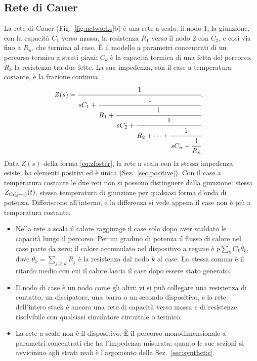 \documentclass[10pt,a4paper]{scrartcl}
\let\newcommand\fcitdefine
\newcommand{\Zjc}{Z_\mathrm{th(j-c)}}
\begin{document}
\subsection{Rete di Cauer}
La rete di Cauer (Fig.~\ref{fig:networks}b) è una rete a scala: il nodo 1, la giunzione, con la capacità $C_1$ verso massa, la resistenza $R_1$ verso il nodo 2 con $C_2$, e così via fino a $R_n$, che termina al case. È il modello a parametri concentrati di un percorso termico a strati piani: $C_k$ è la capacità termica di una fetta del percorso, $R_k$ la resistenza tra due fette. La sua impedenza, con il case a temperatura costante, è la frazione continua
\begin{equation}
Z(s) = \cfrac{1}{sC_1 + \cfrac{1}{R_1 + \cfrac{1}{sC_2 + \cfrac{1}{R_2 + \cdots + \cfrac{1}{sC_n + \cfrac{1}{R_n}}}}}} .
\label{eq:zcauer}
\end{equation}
Data $Z(s)$ della forma \eqref{eq:zfoster}, la rete a scala con la stessa impedenza esiste, ha elementi positivi ed è unica (Sez.~\ref{sec:positive}). Con il case a temperatura costante le due reti non si possono distinguere dalla giunzione: stessa $\Zjc(t)$, stessa temperatura di giunzione per qualsiasi forma d'onda di potenza. Differiscono all'interno, e la differenza si vede appena il case non è più a temperatura costante.
\begin{itemize}
\item Nella rete a scala il calore raggiunge il case solo dopo aver scaldato le capacità lungo il percorso. Per un gradino di potenza il flusso di calore nel case parte da zero; il calore accumulato nel dispositivo a regime è $p\sum_k C_k\theta_k$, dove $\theta_k = \sum_{j\geq k} R_j$ è la resistenza dal nodo $k$ al case. La stessa somma è il ritardo medio con cui il calore lascia il case dopo essere stato generato.
\item Il nodo di case è un nodo come gli altri: vi si può collegare una resistenza di contatto, un dissipatore, una barra o un secondo dispositivo, e la rete dell'intero stack è ancora una rete di capacità verso massa e di resistenze, risolvibile con qualsiasi simulatore circuitale o termico.
\item La rete a scala non è il dispositivo. È il percorso monodimensionale a parametri concentrati che ha l'impedenza misurata; quanto le sue sezioni si avvicinino agli strati reali è l'argomento della Sez.~\ref{sec:synthetic}.
\end{itemize}

\end{document}
